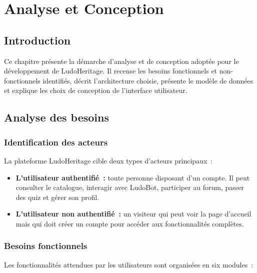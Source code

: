 \chapter{Analyse et Conception}

\section{Introduction}

Ce chapitre présente la démarche d'analyse et de conception adoptée pour le développement de
LudoHeritage. Il recense les besoins fonctionnels et non-fonctionnels identifiés, décrit
l'architecture choisie, présente le modèle de données et explique les choix de conception
de l'interface utilisateur.

\section{Analyse des besoins}

\subsection{Identification des acteurs}

La plateforme LudoHeritage cible deux types d'acteurs principaux~:

\begin{itemize}
    \item \textbf{L'utilisateur authentifié~:} toute personne disposant d'un compte. Il peut
          consulter le catalogue, interagir avec LudoBot, participer au forum, passer des quiz
          et gérer son profil.

    \item \textbf{L'utilisateur non authentifié~:} un visiteur qui peut voir la page d'accueil
          mais qui doit créer un compte pour accéder aux fonctionnalités complètes.
\end{itemize}

\subsection{Besoins fonctionnels}

Les fonctionnalités attendues par les utilisateurs sont organisées en six modules~:

